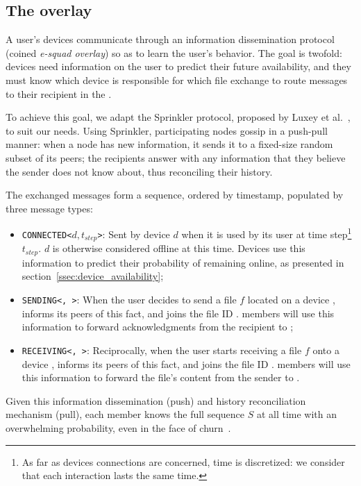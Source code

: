 

\subsection{The \squad overlay}
\label{sec:squad_overlay}

A user's devices communicate through an information dissemination protocol (coined \emph{e-squad overlay}) so as to learn the user's behavior.
The goal is twofold: 
devices need information on the user to predict their future availability, 
and they must know which device is responsible for which file exchange to route messages to their recipient in the \squad.

To achieve this goal, we adapt the Sprinkler protocol, proposed by Luxey et al.~\cite{luxey:hal-01704172}, to suit our needs. 
Using Sprinkler, participating nodes gossip in a push-pull manner: 
when a node has new information, it sends it to a fixed-size random subset of its peers; 
the recipients answer with any information that they believe the sender does not know about, thus reconciling their history.

The exchanged messages form a sequence, ordered by timestamp, populated by three message types:
\begin{itemize}
	\item \texttt{CONNECTED<$d, t_{step}$>}: Sent by device $d$ when it is used by its user at time step\footnote{As far as devices connections are concerned, time is discretized: we consider that each interaction lasts the same time.} $t_{step}$. $d$ is otherwise considered offline at this time. Devices use this information to predict their probability of remaining online, as presented in section~\ref{ssec:device_availability};
	\item \texttt{SENDING<\sendingdevice, \fileid>}: When the user decides to send a file $f$ located on a device \sendingdevice, \sendingdevice informs its peers of this fact, and joins the file ID \fileid. \Squad members will use this information to forward acknowledgments from the recipient to \sendingdevice;
	\item \texttt{RECEIVING<\recdevice, \fileid>}: Reciprocally, when the user starts receiving a file $f$ onto a device \recdevice, \recdevice informs its peers of this fact, and joins the file ID \fileid. \Squad members will use this information to forward the file's content from the sender to \recdevice.
\end{itemize}

Given this information dissemination (push) and history reconciliation mechanism (pull), each \squad member knows the full sequence $S$ at all time with an overwhelming probability, even in the face of churn~\cite{luxey:cascade}.

